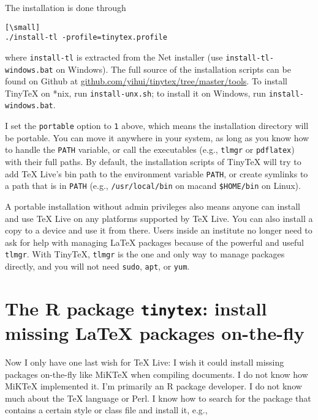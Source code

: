 \documentclass{tugboat}
\def\macOS{mac\acro{OS}}
\def\tinytex{\texttt{tinytex}}
\begin{document}
The installation is done through

\begin{verbatim}[\small]
./install-tl -profile=tinytex.profile
\end{verbatim}

where \texttt{install-tl} is extracted from the Net installer (use
\texttt{install-tl-windows.bat} on Windows). The full source of the
installation scripts can be found on Github at
\url{github.com/yihui/tinytex/tree/master/tools}. To install
TinyTeX on *nix, run \texttt{install-unx.sh}; to install it on Windows,
run \texttt{install-windows.bat}.

I set the \texttt{portable} option to \texttt{1} above, which means the
installation directory will be portable. You can move it anywhere in
your system, as long as you know how to handle the \texttt{PATH}
variable, or call the executables (e.g., \texttt{tlmgr} or
\texttt{pdflatex}) with their full paths. By default, the installation
scripts of TinyTeX will try to add \TeX{} Live's bin path to the
environment variable \texttt{PATH}, or create symlinks to a path that is
in \texttt{PATH} (e.g., \texttt{/usr/local/bin} on \macOS and
\texttt{\$HOME/bin} on Linux).

A portable installation without admin privileges also means anyone can
install and use \TeX{} Live on any platforms supported by \TeX{} Live. You can
also install a copy to a  device and use it from there. Users inside
an institute no longer need to ask for  help with managing \LaTeX{}
packages because of the powerful and useful \texttt{tlmgr}. With
TinyTeX, \texttt{tlmgr} is the one and only way to manage packages
directly, and you will not need \texttt{sudo}, \texttt{apt}, or
\texttt{yum}.

\hypertarget{the-r-package-tinytex-install-missing-latex-packages-on-the-fly}{%
\section{\texorpdfstring{The R package \tinytex{}: install missing
\LaTeX{} packages
on-the-fly}{The R package tinytex: install missing \LaTeX{} packages on-the-fly}}\label{the-r-package-tinytex-install-missing-latex-packages-on-the-fly}}

Now I only have one last wish for \TeX{} Live: I wish it could install
missing packages on-the-fly like MiKTeX when compiling documents. I do
not know how MiKTeX implemented it. I'm primarily an R \cite{R-base}
package developer. I do not know much about the \TeX{} language or Perl. I
know how to search for the package that contains a certain style or
class file and install it, e.g.,
\end{document}
